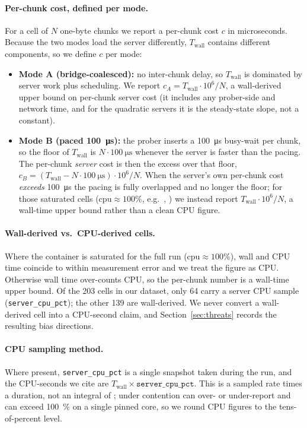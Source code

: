 \paragraph{Per-chunk cost, defined per mode.}
For a cell of $N$ one-byte chunks we report a per-chunk cost $c$ in
microseconds. Because the two modes load the server differently,
$T_\mathrm{wall}$ contains different components, so we define $c$
per mode:
\begin{itemize}
  \item \textbf{Mode A (bridge-coalesced):} no inter-chunk delay,
    so $T_\mathrm{wall}$ is dominated by server work plus
    scheduling. We report $c_A = T_\mathrm{wall}\cdot 10^{6}/N$, a
    wall-derived upper bound on per-chunk server cost (it includes
    any prober-side and network time, and for the quadratic
    servers it is the steady-state slope, not a constant).
  \item \textbf{Mode B (paced \SI{100}{\micro\second}):} the
    prober inserts a \SI{100}{\micro\second} busy-wait per chunk,
    so the floor of $T_\mathrm{wall}$ is
    $N\cdot\SI{100}{\micro\second}$ whenever the server is faster
    than the pacing. The per-chunk \emph{server} cost is then the
    excess over that floor,
    $c_B = (T_\mathrm{wall}-N\cdot\SI{100}{\micro\second})\cdot
    10^{6}/N$. When the server's own per-chunk cost \emph{exceeds}
    \SI{100}{\micro\second} the pacing is fully overlapped and no
    longer the floor; for those saturated cells
    ($\mathrm{cpu}\!\approx\!100\%$, e.g.\ ,
    ) we instead report
    $T_\mathrm{wall}\cdot 10^{6}/N$, a wall-time upper bound rather
    than a clean CPU figure.
\end{itemize}

\paragraph{Wall-derived vs.\ CPU-derived cells.}
Where the container is saturated for the full run
($\mathrm{cpu}\!\approx\!100\%$), wall and CPU time coincide to
within measurement error and we treat the figure as CPU.
Otherwise wall time over-counts CPU, so the per-chunk number is a
wall-time upper bound. Of the 203 cells in our dataset, only 64
carry a server CPU sample (\texttt{server\_cpu\_pct}); the other
139 are wall-derived. We never convert a wall-derived cell into a
CPU-second claim, and Section~\ref{sec:threats} records the
resulting bias directions.

\paragraph{CPU sampling method.}
Where present, \texttt{server\_cpu\_pct} is a single
 snapshot taken during the run,
and the CPU-seconds we cite are
$T_\mathrm{wall}\times\texttt{server\_cpu\_pct}$. This is a
sampled rate times a duration, not an integral of
; under contention  can
over- or under-report and can exceed \SI{100}{\percent} on a
single pinned core, so we round CPU figures to the
tens-of-percent level.

